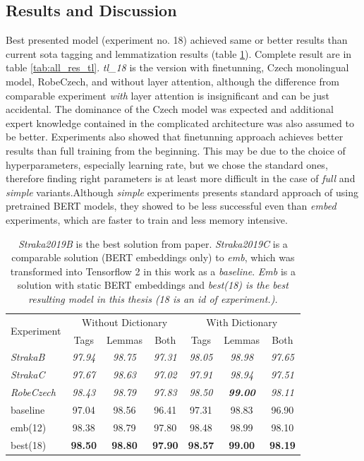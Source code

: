\subsection{Results and Discussion}
Best presented model (experiment no. 18) achieved same or better results than current \acrlong{sota} tagging and lemmatization results (table \ref{tab:all_prew}). Complete result are in table \ref{tab:all_res_tl}. \textit{tl\_18} is the version with finetunning, Czech monolingual model, RobeCzech, and without layer attention, although the difference from comparable experiment \textit{with} layer attention is insignificant and can be just accidental. The dominance of the Czech model was expected and additional expert knowledge contained in the complicated architecture was also assumed to be better. Experiments also showed that finetunning approach achieves better results than full training from the beginning. This may be due to the choice of hyperparameters, especially learning rate, but  we chose the standard ones, therefore finding right parameters is at least more difficult in the case of \textit{full} and \textit{simple} variants.Although \textit{simple} experiments presents standard approach of using pretrained BERT models, they showed to be less successful even than \textit{embed} experiments, which are faster to train and less memory intensive. 

\begin{table}[!h]
\centering
  \begin{tabular}{|l||ccc||ccc|}
  \hline
\multirow{2}{*}{Experiment} & \multicolumn{3}{c||}{Without Dictionary}  &
      \multicolumn{3}{c|}{With Dictionary} \\ 
    & Tags & Lemmas & Both & Tags & Lemmas & Both \\ \hline \hline
    \textit{StrakaB} & \textit{97.94} & \textit{98.75} & \textit{97.31} & \textit{98.05} & \textit{98.98} & \textit{97.65 }\\ \hline
   \textit{ StrakaC} & \textit{97.67} & \textit{98.63} & \textit{97.02} & \textit{97.91 }& \textit{98.94} & \textit{97.51} \\ \hline
     \textit{RobeCzech} & \textit{98.43} & \textit{98.79}  & \textit{97.83}  & \textit{98.50} & \textit{\textbf{99.00}}  & \textit{98.11} \\ \hline \hline
      baseline & 97.04  & 98.56  & 96.41 &  97.31   & 98.83  & 96.90 \\ \hline 
    emb(12) & 98.38  &98.79  & 97.80 & 98.48  & 98.99 & 98.10 \\ \hline
    best(18) & \textbf{98.50}  & \textbf{98.80} &\textbf{ 97.90}  & \textbf{98.57}  & \textbf{99.00}  & \textbf{98.19}  \\ \hline  
  \end{tabular}
  \caption{%
  \textit{Straka2019B} is the best solution from \citep{Straka2019} paper. \textit{Straka2019C} is a comparable solution  (BERT embeddings only) to \textit{emb}, which was transformed into Tensorflow 2 in this work as a \textit{baseline}. \textit{Emb} is a solution with static BERT embeddings and \textit{best(18) is the best resulting model in this thesis (18 is an id of experiment.). }}
\label{tab:all_prew} 
\end{table}

